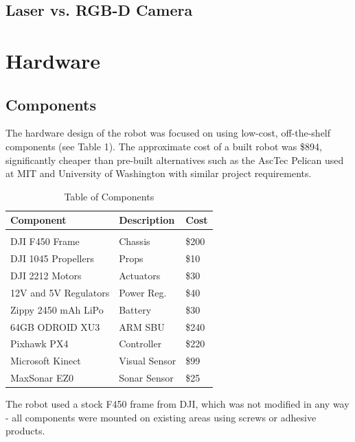 \documentclass[letterpaper, oneside, 10pt]{report}
\begin{document}
\subsection{Laser vs. RGB-D Camera}

\section{Hardware}

\subsection{Components}

The hardware design of the robot was focused on using low-cost, off-the-shelf components (see Table 1). The approximate cost of a built robot was \$894, significantly cheaper than pre-built alternatives such as the AscTec Pelican used at MIT \cite{bachrach2011range} and University of Washington \cite{bachrach2012estimation} with similar project requirements.

\begin{table}[h!]
  \centering
  \caption{Table of Components}
  \vspace{2mm}
  \begin{tabular}{l l l}
    \hline \hline
    \vspace{-2mm}
    Component & \multicolumn{1}{l}{Description} & \multicolumn{1}{l}{Cost} \\ [1ex]
    \hline
    & \\
    DJI F450 Frame & Chassis & \$200 \\
    DJI 1045 Propellers & Props & \$10 \\
    DJI 2212 Motors & Actuators & \$30 \\
    12V and 5V Regulators & Power Reg. & \$40 \\
    Zippy 2450 mAh LiPo & Battery & \$30 \\
    64GB ODROID XU3 & ARM SBU & \$240 \\
    Pixhawk PX4 & Controller & \$220 \\
    Microsoft Kinect & Visual Sensor & \$99 \\
    MaxSonar EZ0	& Sonar Sensor & \$25 \\
  \end{tabular}
\end{table}

\noindent The robot used a stock F450 frame from DJI, which was not modified in any way - all components were mounted on existing areas using screws or adhesive products.
\end{document}
